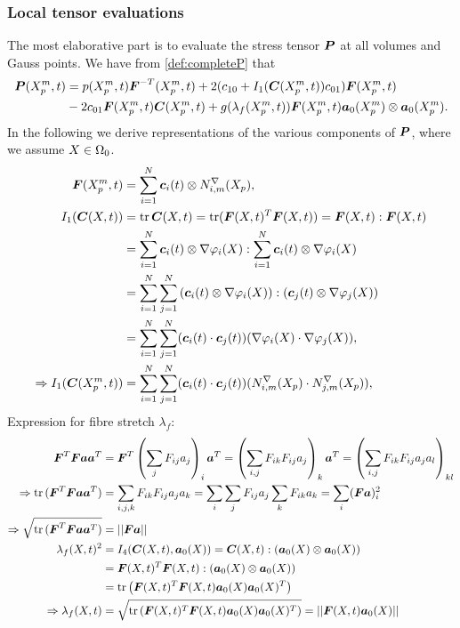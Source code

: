 \subsubsection{Local tensor evaluations}
The most elaborative part is to evaluate the stress tensor $\vP$ at all volumes and Gauss points.
We have from \eqref{def:completeP} that
\begin{align*}
		\vP(\pmp,t) &= p(\pmp,t)\vF^{-T}(\pmp,t) + 2(c_{10} + I_1(\vC(\pmp,t))c_{01})\vF(\pmp,t)\\
			 &- 2c_{01}\vF(\pmp,t)\vC(\pmp,t)+g(\lambda_f(\pmp,t))\vF(\pmp,t)\va_0(\pmp)\otimes\va_0(\pmp).
\end{align*}
In the following we derive representations of the various components of $\vP$, where we assume $X\in\Or$.
\begin{align*}
	\vF(\pmp,t) &= \sumi \vc_i(t)\otimes \dNimp,\\
	I_1(\vC(X,t)) &= \tr\vC(X,t) = \tr(\vF(X,t)^T\vF(X,t)) = \vF(X,t) : \vF(X,t)\\
	&= \sumi \vc_i(t)\otimes \dpi : \sumi \vc_i(t)\otimes \dpi\\
	&= \sumi\sumj \left(\vc_i(t)\otimes \dpi\right) : (\vc_j(t)\otimes \dpj)\\
	&= \sumi\sumj (\vc_i(t) \cdot \vc_j(t))(\dpi \cdot \dpj),\\
	\Rightarrow I_1(\vC(\pmp,t)) &= \sumi\sumj (\vc_i(t) \cdot \vc_j(t))(\dNimp \cdot \dNjmp),\\
\end{align*}
Expression for fibre stretch $\lambda_f$:
\begin{align*}
	\vF^T\vF\va\va^T &= \vF^T\left(\sum_j F_{ij}a_j\right)_i\va^T = \left(\sum_{i,j} F_{ik}F_{ij}a_j\right)_k\va^T
		= \left(\sum_{i,j} F_{ik}F_{ij}a_ja_l\right)_{kl}\\
	\Rightarrow \tr{(\vF^T\vF\va\va^T)} &= \sum_{i,j,k} F_{ik}F_{ij}a_ja_k = \sum_i \sum_jF_{ij}a_j \sum_k F_{ik}a_k = \sum_i (\vF\va)_i^2\\
	\Rightarrow \sqrt{\tr{(\vF^T\vF\va\va^T)}} &= \no{\vF\va}\\
	\lambda_f(X,t)^2 &=I_4(\vC(X,t),\va_0(X)) = \vC(X,t):(\va_0(X)\otimes \va_0(X))\\
			&=  \vF(X,t)^T\vF(X,t) : (\va_0(X)\otimes \va_0(X))\\
			&= \tr{\left(\vF(X,t)^T\vF(X,t)\va_0(X)\va_0(X)^T\right)}\\
	\Rightarrow \lambda_f(X,t) &=
			\sqrt{\tr{\left(\vF(X,t)^T\vF(X,t)\va_0(X)\va_0(X)^T\right)}} = \no{\vF(X,t)\va_0(X)} 
\end{align*}
